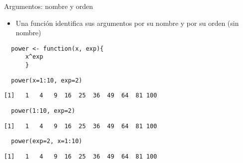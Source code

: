 \documentclass[xcolor={usenames,svgnames,dvipsnames}]{beamer}
\begin{document}
\begin{frame}[fragile,label={sec:orgheadline5}]{Argumentos: nombre y orden}
 \begin{itemize}
\item Una función identifica sus argumentos por su nombre y por su orden (sin nombre)
\end{itemize}

\lstset{language=R,label= ,caption= ,captionpos=b,numbers=none}
\begin{lstlisting}
  power <- function(x, exp){
      x^exp
      }
\end{lstlisting}

\lstset{language=R,label= ,caption= ,captionpos=b,numbers=none}
\begin{lstlisting}
  power(x=1:10, exp=2)
\end{lstlisting}

\begin{verbatim}
[1]   1   4   9  16  25  36  49  64  81 100
\end{verbatim}

\lstset{language=R,label= ,caption= ,captionpos=b,numbers=none}
\begin{lstlisting}
  power(1:10, exp=2)
\end{lstlisting}

\begin{verbatim}
[1]   1   4   9  16  25  36  49  64  81 100
\end{verbatim}

\lstset{language=R,label= ,caption= ,captionpos=b,numbers=none}
\begin{lstlisting}
  power(exp=2, x=1:10)
\end{lstlisting}

\begin{verbatim}
[1]   1   4   9  16  25  36  49  64  81 100
\end{verbatim}
\end{frame}
\end{document}
